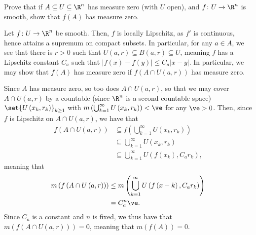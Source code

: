 \documentclass[10pt]{mypackage}
\begin{document}
\begin{problem}[Problem 2]
  Prove that if $A\subseteq U\subseteq \R^{n}$ has measure zero (with $U$ open), and $f\colon U\rightarrow \R^{n}$ is smooth, show that $f(A)$ has measure zero.
\end{problem}
\begin{solution}
  Let $f\colon U\rightarrow \R^{n}$ be smooth. Then, $f$ is locally Lipschitz, as $f'$ is continuous, hence attains a supremum on compact subsets. In particular, for any $a\in A$, we see that there is $r > 0$ such that $U\left( a,r \right)\subseteq B\left( a,r \right)\subseteq U$, meaning $f$ has a Lipschitz constant $C_{a}$ such that $\left\vert f(x)-f(y) \right\vert \leq C_a\left\vert x-y \right\vert$. In particular, we may show that $f(A)$ has measure zero if $f\left( A\cap U\left( a,r \right) \right)$ has measure zero.\newline

  Since $A$ has measure zero, so too does $A\cap U\left( a,r \right)$, so that we may cover $A\cap U\left( a,r \right)$ by a countable (since $\R^n$ is a second countable space) $\set{U\left( x_k,r_k \right)}_{k\geq 1}$ with $m\left( \bigcup_{k = 1}^{\infty}U\left( x_k,r_k \right) \right) < \ve$ for any $\ve > 0$. Then, since $f$ is Lipschitz on $A\cap U\left( a,r \right)$, we have that
  \begin{align*}
    f\left( A\cap U\left( a,r \right) \right) &\subseteq f\left( \bigcup_{k=1}^{\infty}U\left( x_k,r_k \right) \right)\\
                                              &\subseteq \bigcup_{k=1}^{\infty} U\left( x_k,r_k \right)\\
                                                                  &\subseteq \bigcup_{k=1}^{\infty} U\left( f\left( x_k \right),C_ar_k \right),
  \end{align*}
  meaning that
  \begin{align*}
    m\left( f\left( A\cap U\left( a,r \right) \right) \right) &\leq m\left( \bigcup_{k=1}^{\infty}U\left( f\left( x-k \right),C_ar_k \right) \right)\\
                                                              &= C_a^{n}\ve.
  \end{align*}
  Since $C_a$ is a constant and $n$ is fixed, we thus have that $m\left( f\left( A\cap U\left( a,r \right) \right) \right) = 0$, meaning that $m\left( f(A) \right) = 0$.
\end{solution}
\end{document}
